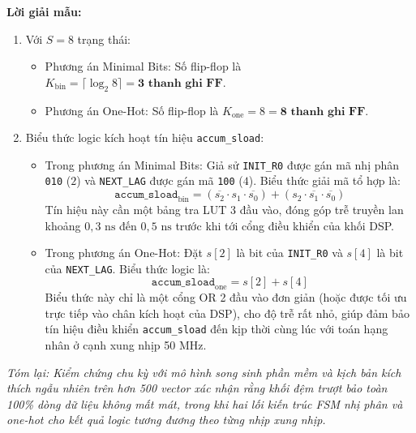 \textbf{Lời giải mẫu:}
\begin{enumerate}[label=(\alph*)]
    \item Với $S = 8$ trạng thái:
    \begin{itemize}
        \item Phương án Minimal Bits: Số flip-flop là $K_{\text{bin}} = \lceil \log_2 8 \rceil = \textbf{3 thanh ghi FF}$.
        \item Phương án One-Hot: Số flip-flop là $K_{\text{one}} = 8 = \textbf{8 thanh ghi FF}$.
    \end{itemize}
    \item Biểu thức logic kích hoạt tín hiệu \texttt{accum\_sload}:
    \begin{itemize}
        \item Trong phương án Minimal Bits: Giả sử \texttt{INIT\_R0} được gán mã nhị phân \texttt{010} ($2$) và \texttt{NEXT\_LAG} được gán mã \texttt{100} ($4$). Biểu thức giải mã tổ hợp là:
        \begin{equation}
        \texttt{accum\_sload}_{\text{bin}} = (\overline{s_2} \cdot s_1 \cdot \overline{s_0}) + (s_2 \cdot \overline{s_1} \cdot \overline{s_0})
        \end{equation}
        Tín hiệu này cần một bảng tra LUT 3 đầu vào, đóng góp trễ truyền lan khoảng $0{,}3\text{ ns}$ đến $0{,}5\text{ ns}$ trước khi tới cổng điều khiển của khối DSP.
        \item Trong phương án One-Hot: Đặt $s[2]$ là bit của \texttt{INIT\_R0} và $s[4]$ là bit của \texttt{NEXT\_LAG}. Biểu thức logic là:
        \begin{equation}
        \texttt{accum\_sload}_{\text{one}} = s[2] + s[4]
        \end{equation}
        Biểu thức này chỉ là một cổng OR 2 đầu vào đơn giản (hoặc được tối ưu trực tiếp vào chân kích hoạt của DSP), cho độ trễ rất nhỏ, giúp đảm bảo tín hiệu điều khiển \texttt{accum\_sload} đến kịp thời cùng lúc với toán hạng nhân ở cạnh xung nhịp 50 MHz.
    \end{itemize}
\end{enumerate}

\textit{Tóm lại: Kiểm chứng chu kỳ với mô hình song sinh phần mềm và kịch bản kích thích ngẫu nhiên trên hơn 500 vector xác nhận rằng khối đệm trượt bảo toàn 100\% dòng dữ liệu không mất mát, trong khi hai lối kiến trúc FSM nhị phân và one-hot cho kết quả logic tương đương theo từng nhịp xung nhịp.}
